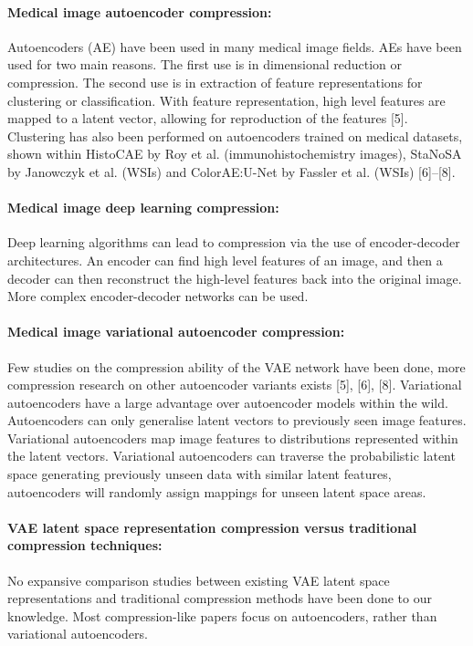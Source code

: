 \documentclass[review]{elsarticle}
\begin{document}
\paragraph{Medical image autoencoder compression:} Autoencoders (AE) have been used in many medical image fields. AEs have been used for two main reasons. The first use is in dimensional reduction or compression. The second use is in extraction of feature representations for clustering or classification.
With feature representation, high level features are mapped to a latent vector, allowing for reproduction of the features [5]. Clustering has also been performed on autoencoders trained on medical datasets, shown within HistoCAE by Roy et al. (immunohistochemistry images), StaNoSA by Janowczyk et al. (WSIs) and ColorAE:U-Net by Fassler et al. (WSIs) [6]–[8].

\paragraph{Medical image deep learning compression:} Deep learning algorithms can lead to compression via the use of encoder-decoder architectures. An encoder can find high level features of an image, and then a decoder can then reconstruct the high-level features back into the original image. More complex encoder-decoder networks can be used.

\paragraph{Medical image variational autoencoder compression:} Few studies on the compression ability of the VAE network have been done, more compression research on other autoencoder variants exists [5], [6], [8]. Variational autoencoders have a large advantage over autoencoder models within the wild. Autoencoders can only generalise latent vectors to previously seen image features. Variational autoencoders map image features to distributions represented within the latent vectors. Variational autoencoders can traverse the probabilistic latent space generating previously unseen data with similar latent features, autoencoders will randomly assign mappings for unseen latent space areas.

\paragraph{VAE latent space representation compression versus traditional compression techniques:} No expansive comparison studies between existing VAE latent space representations and traditional compression methods have been done to our knowledge. Most compression-like papers focus on autoencoders, rather than variational autoencoders.
\end{document}
